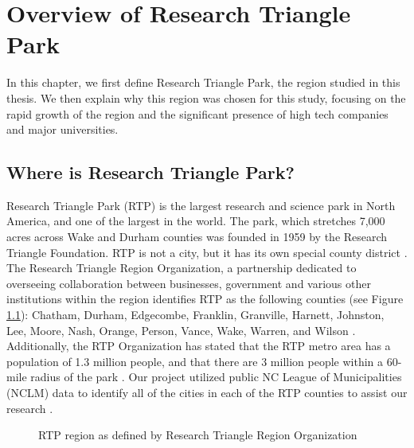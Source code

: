 \chapter{Overview of Research Triangle Park}
\label{Chapter:RTP}

In this chapter, we first define Research Triangle Park, the region studied in this thesis. We then explain why this region was chosen for this study, focusing on the rapid growth of the region and the significant presence of high tech companies and major universities.

\section{Where is Research Triangle Park?}
Research Triangle Park (RTP) is the largest research and science park in North America, and one of the largest in the world. The park, which stretches 7,000 acres across Wake and Durham counties was founded in 1959 by the Research Triangle Foundation. RTP is not a city, but it has its own special county district \cite{_research_????}. The Research Triangle Region Organization, a partnership dedicated to overseeing collaboration between businesses, government and various other institutions within the region identifies RTP as the following counties (see Figure \ref{fig:rtp-region}): Chatham, Durham, Edgecombe, Franklin, Granville, Harnett, Johnston, Lee, Moore, Nash, Orange, Person, Vance, Wake, Warren, and Wilson \cite{_research_????}. Additionally, the RTP Organization has stated that the RTP metro area has a population of 1.3 million people, and that there are 3 million people within a 60-mile radius of the park \cite{weddle_research_????}. Our project utilized public NC League of Municipalities (NCLM) data to identify all of the cities in each of the RTP counties to assist our research \cite{_north_????}.

\begin{figure}
\begin{center}
\caption{RTP region as defined by Research Triangle Region Organization \cite{_research_????}}
\label{fig:rtp-region}
\end{center}
\end{figure}

